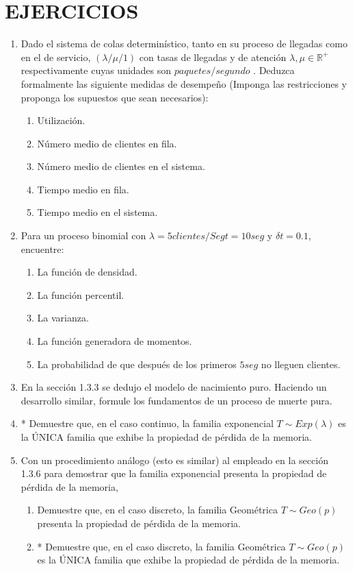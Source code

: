 \section{EJERCICIOS}

\begin{enumerate}
    \item Dado el sistema de colas determinístico, tanto en su proceso de llegadas como en el de servicio, $ \left ( \lambda / \mu / 1 \right ) $ con tasas de llegadas y de atención $ \lambda, \mu \in \mathbb{R}^{+} $ respectivamente cuyas unidades son $ \displaystyle paquetes / segundo $ . Deduzca formalmente las siguiente medidas de desempeño (Imponga las restricciones y proponga los supuestos que sean necesarios):
    \begin{enumerate}
        \item Utilización.
        \item Número medio de clientes en fila.
        \item Número medio de clientes en el sistema.
        \item Tiempo medio en fila.
        \item Tiempo medio en el sistema.
    \end{enumerate}
    \item Para un proceso binomial con $ \lambda = 5 clientes/Seg  t=10 seg $ y $ \delta t = 0.1 $, encuentre:
    \begin{enumerate}
        \item La función de densidad.
        \item La función percentil.
        \item La varianza.
        \item La función generadora de momentos.
        \item La probabilidad de que después de los primeros $ 5seg $ no lleguen clientes.
    \end{enumerate}
    \item En la sección 1.3.3 se dedujo el modelo de nacimiento puro. Haciendo un desarrollo similar, formule los fundamentos de un proceso de muerte pura.
    \item * Demuestre que, en el caso continuo, la familia exponencial $ T \sim Exp \left ( \lambda \right ) $ es la ÚNICA familia que exhibe la propiedad de pérdida de la memoria.
    \item Con un procedimiento análogo (esto es similar) al empleado en la sección 1.3.6 para demostrar que la familia exponencial presenta la propiedad de pérdida de la memoria, 
    \begin{enumerate}
        \item Demuestre que, en el caso discreto, la familia Geométrica $ T \sim Geo \left ( p \right ) $ presenta la propiedad de pérdida de la memoria.
        \item * Demuestre que, en el caso discreto, la familia Geométrica $ T \sim Geo \left ( p \right ) $ es la ÚNICA familia que exhibe la propiedad de pérdida de la memoria.
    \end{enumerate}
\end{enumerate}
